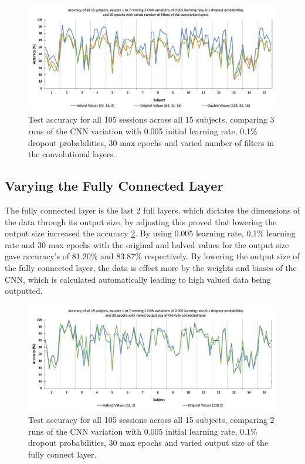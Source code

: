 \begin{figure}[H]
\centering
\includegraphics[scale=0.5]{Media/SBJ1-15_S1-7/SBJ1-15&S1-7_Varied_Filter_Numbers_Accuracy.png}
\caption{Test accuracy for all 105 sessions across all 15 subjects, comparing 3 runs of the CNN variation with 0.005 initial learning rate, 0.1\% dropout probabilities, 30 max epochs and varied number of filters in the convolutional layers.}
\label{S1-7 0.1dp 0.005lr 30epochs varied filters}
\end{figure}

\subsection{Varying the Fully Connected Layer}
\label{All Subjects, 1 to 7 Changing the Epochs SubSection}

The fully connected layer is the last 2 full layers, which dictates the dimensions of the data through its output size, by adjusting this proved that lowering the output size increased the accuracy \cref{S1-7 0.005lr 0.1dr 30epoch varied fcl}. By using 0.005 learning rate, 0,1\% learning rate and 30 max epochs with the original and halved values for the output size gave accuracy's of 81.20\% and 83.87\% respectively. By lowering the output size of the fully connected layer, the data is effect more by the weights and biases of the CNN, which is calculated automatically leading to high valued data being outputted.

\begin{figure}[H]
\centering
\includegraphics[scale=0.5]{Media/SBJ1-15_S1-7/SBJ1-15&S1-7_Varied_FullyConnctedLayer_Accuracy.png}
\caption{Test accuracy for all 105 sessions across all 15 subjects, comparing 2 runs of the CNN variation with 0.005 initial learning rate, 0.1\% dropout probabilities, 30 max epochs and varied output size of the fully connect layer.}
\label{S1-7 0.005lr 0.1dr 30epoch varied fcl}
\end{figure}

